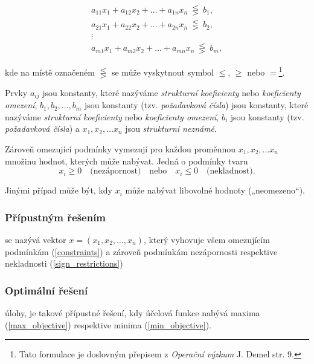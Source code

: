 \begin{equation} \label{constraints}
    \begin{gathered}
        a_{11}x_1 + a_{12}x_2 + \ldots + a_{1n}x_n \ \lesseqgtr \ b_1, \\
        a_{21}x_1 + a_{22}x_2 + \ldots + a_{2n}x_n \ \lesseqgtr \ b_2, \\
        \vdots \\
        a_{m1}x_1 + a_{m2}x_2 + \ldots + a_{mn}x_n \ \lesseqgtr \ b_m,
    \end{gathered}
\end{equation}

kde na místě označeném $\lesseqgtr$ se může vyskytnout symbol $\leq$, $\geq$ nebo $=$\footnote{Tato formulace je doslovným přepisem z \textit{Operační výzkum} J. Demel \cite{demel} str. 9.}.

Prvky $a_{ij}$ jsou konstanty, které nazýváme \textit{strukturní koeficienty} nebo \textit{koeficienty omezení},
$b_1, b_2, \ldots, b_m$
jsou konstanty (tzv. \textit{požadavková čísla})
jsou konstanty, které nazýváme \textit{strukturní koeficienty} nebo \textit{koeficienty omezení}, $b_i$ jsou konstanty (tzv. \textit{požadavková čísla})
a $x_1, x_2, \ldots x_n$ jsou \textit{strukturní neznámé}.

Zároveň omezující podmínky vymezují pro každou proměnnou $x_1, x_2, \ldots x_n$ množinu hodnot, kterých může nabývat. 
Jedná o podmínky tvaru
\begin{equation} \label{sign_restrictions}
    x_i \geq 0 \quad \text{(nezápornost)} \quad \text{nebo} \quad x_i \leq 0 \quad \text{(nekladnost)}.
\end{equation}

Jinými případ může být, kdy $x_i$ může nabývat libovolné hodnoty („neomezeno“).

\subsubsection{Přípustným řešením} se nazývá vektor $x = (x_1, x_2, \ldots, x_n)$, který vyhovuje všem omezujícím podmínkám (\ref{constraints}) a zároveň podmínkám nezápornosti respektive nekladnosti (\ref{sign_restrictions})

\subsubsection{Optimální řešení} úlohy, je takové přípustné řešení, kdy účelová funkce nabývá maxima (\ref{max_objective}) respektive minima (\ref{min_objective}).

